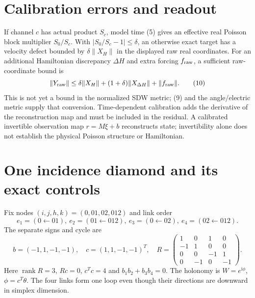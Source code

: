 \documentclass[10pt,a4paper]{article}
\newcommand{\ii}{\mathrm i}
\newcommand{\rank}{\operatorname{rank}}
\begin{document}
\section{Calibration errors and readout}
If channel $c$ has actual product $S_c$, model time (5) gives an effective real Poisson block multiplier $S_0/S_c$. With $|S_0/S_c-1|\le\delta$, an otherwise exact target has a velocity defect bounded by $\delta\|X_H\|$ in the displayed raw real coordinates. For an additional Hamiltonian discrepancy $\Delta H$ and extra forcing $f_{\rm raw}$, a sufficient raw-coordinate bound is
\[
\|Y_{\rm raw}\|\le\delta\|X_H\|+(1+\delta)\|X_{\Delta H}\|+\|f_{\rm raw}\|.
\tag{10}
\]
This is not yet a bound in the normalized SDW metric; (9) and the angle/electric metric supply that conversion. Time-dependent calibration adds the derivative of the reconstruction map and must be included in the residual. A calibrated invertible observation map $r=M\xi+b$ reconstructs state; invertibility alone does not establish the physical Poisson structure or Hamiltonian.

\newpage
\section{One incidence diamond and its exact controls}
Fix nodes $(i,j,h,k)=(0,01,02,012)$ and link order
\[
e_1=(0\leftarrow01),\ e_2=(01\leftarrow012),\ e_3=(0\leftarrow02),\ e_4=(02\leftarrow012).
\]
The separate signs and cycle are
\[
b=(-1,1,-1,-1),\quad c=(1,1,-1,-1)^T,\quad
R=\begin{pmatrix}1&0&1&0\\-1&1&0&0\\0&0&-1&1\\0&-1&0&-1\end{pmatrix}.
\tag{11}
\]
Here $\rank R=3$, $Rc=0$, $c^Tc=4$ and $b_1b_2+b_3b_4=0$. The holonomy is $W=e^{\ii\phi}$, $\phi=c^T\theta$. The four links form one loop even though their directions are downward in simplex dimension.
\end{document}
